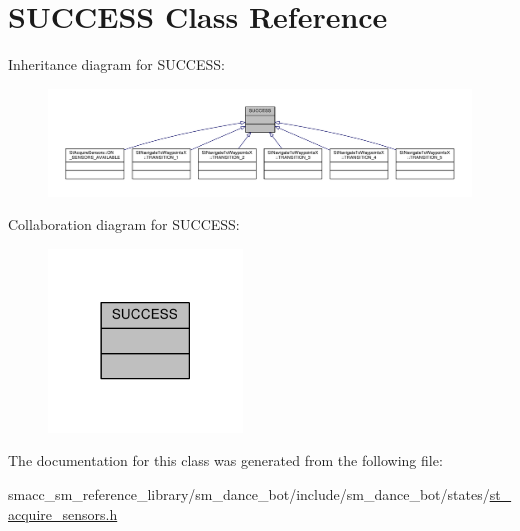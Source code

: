 \hypertarget{classSUCCESS}{}\section{S\+U\+C\+C\+E\+SS Class Reference}
\label{classSUCCESS}


Inheritance diagram for S\+U\+C\+C\+E\+SS\+:
\nopagebreak
\begin{figure}[H]
\begin{center}
\leavevmode
\includegraphics[width=350pt]{classSUCCESS__inherit__graph}
\end{center}
\end{figure}


Collaboration diagram for S\+U\+C\+C\+E\+SS\+:
\nopagebreak
\begin{figure}[H]
\begin{center}
\leavevmode
\includegraphics[width=146pt]{classSUCCESS__coll__graph}
\end{center}
\end{figure}


The documentation for this class was generated from the following file\+:\begin{DoxyCompactItemize}
\item 
smacc\+\_\+sm\+\_\+reference\+\_\+library/sm\+\_\+dance\+\_\+bot/include/sm\+\_\+dance\+\_\+bot/states/\hyperlink{st__acquire__sensors_8h}{st\+\_\+acquire\+\_\+sensors.\+h}\end{DoxyCompactItemize}
